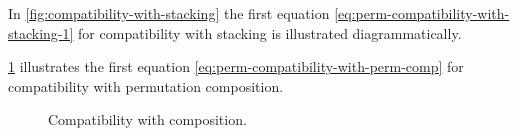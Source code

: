 \begin{figure*}[h]
    \centering
     \qquad \qquad
    \caption{Compatibility with composition. }
    \label{fig:symmetric-stacking-comp-compat}
\end{figure*}

In \cref{fig:compatibility-with-stacking} the first equation \cref{eq:perm-compatibility-with-stacking-1} for compatibility with stacking is illustrated diagrammatically.

\begin{figure*}[h]
    \centering
     \qquad \qquad
    \caption{Sliding. }
    \label{fig:compatibility-with-stacking}
\end{figure*}

\cref{fig:compatibility-perm-comp} illustrates the first equation \cref{eq:perm-compatibility-with-perm-comp} for compatibility with permutation composition.

\begin{figure}[h]
    \centering
     \qquad \qquad
    \caption{Compatibility with composition. }
    \label{fig:compatibility-perm-comp}
\end{figure}

